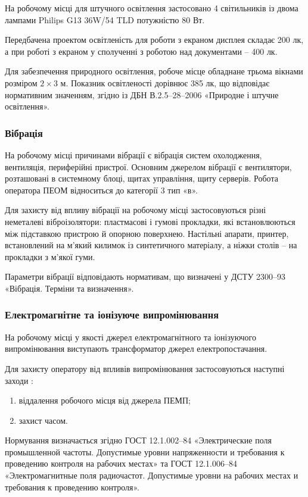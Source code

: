 \documentclass[a4paper,ukrainian,utf8,nocolumnsxix,floatsection,equationsection]{eskdtext}
\renewcommand\paragraph{\subsubsection}
\begin{document}
На робочому місці для штучного освітлення застосовано 4 світильників із двома лампами Philips G13 36W/54 TLD потужністю 80 Вт. 

Передбачена проектом освітленість для роботи з екраном дисплея складає 200 лк, а при роботі з екраном у сполученні з роботою над документами – 400 лк.

Для забезпечення природного освітлення, робоче місце обладнане трьома вікнами розміром $2\times3$ м. Показник освітленості дорівнює 385 лк, що відповідає нормативним значенням, згідно із ДБН В.2.5–28–2006 «Природне і штучне освітлення».

\paragraph{Вібрація}

На робочому місці причинами вібрації є вібрація систем охолодження, вентиляція, периферійні пристрої. Основним джерелом вібрації є вентилятори, розташовані в системному блоці, щитах управління, щиту серверів. Робота оператора ПЕОМ відноситься до категорії 3 тип «в».

Для захисту від впливу вібрації  на робочому місці застосовуються різні неметалеві віброізолятори: пластмасові і гумові прокладки, які встановлюються між підставкою пристрою й опорною поверхнею. Настільні апарати, принтер, встановлений на м'який килимок із синтетичного матеріалу, а ніжки столів – на прокладки з м'якої гуми.

Параметри вібрації відповідають нормативам, що визначені у ДСТУ 2300–93 «Вібрація. Терміни та визначення».

\paragraph{Електромагнітне та іонізуюче випромінювання}

На робочому місці у якості джерел електромагнітного та іонізуючого випромінювання виступають трансформатор джерел електропостачання.


Для захисту оператору від впливів випромінювання застосовуються наступні заходи \cite{work:safety:17}:

\begin{enumerate}
	\item віддалення робочого місця від джерела ПЕМП;
	\item захист часом.
\end{enumerate}

Нормування визначається згідно ГОСТ 12.1.002–84 «Электрические поля промышленной частоты. Допустимые уровни напряженности и требования к проведению контроля на рабочих местах» та ГОСТ 12.1.006–84 «Электромагнитные поля радиочастот. Допустимые уровни на рабочих местах и требования к проведению контроля».
\end{document}
